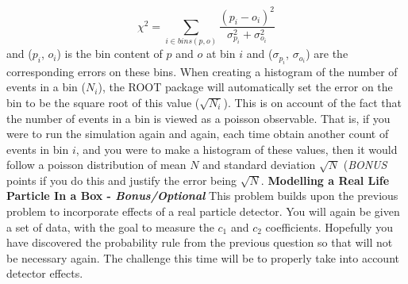 \documentclass[12pt]{article}
\begin{document}
\begin{displaymath}
\chi^{2}=\displaystyle\sum_{i \in bins(p,o)} \frac{(p_{i}-o_{i})^2}{\sigma_{p_{i}}^{2}+\sigma_{o_{i}}^{2}}
\end{displaymath}
and ($p_{i}$, $o_{i}$) is the bin content of $p$ and $o$ at bin $i$ and ($\sigma_{p_{i}}$, $\sigma_{o_{i}}$) are the corresponding errors on these bins.  When creating a histogram of the number of events in a bin ($N_{i}$), the ROOT package will automatically set the error on the bin to be the square root of this value ($\sqrt{N_{i}}$).  This is on account of the fact that the number of events in a bin is viewed as a poisson observable.  That is, if you were to run the simulation again and again, each time obtain another count of events in bin $i$, and you were to make a histogram of these values, then it would follow a poisson distribution of mean $N$ and standard deviation $\sqrt{N}$ (\textit{BONUS} points if you do this and justify the error being $\sqrt{N}$. 
\newline
\newline
\textbf{Modelling a \textbf{Real Life} Particle In a Box - \textit{Bonus/Optional}} 
\newline
This problem builds upon the previous problem to incorporate effects of a real particle detector.  You will again be given a set of data, with the goal to measure the $c_1$ and $c_2$ coefficients.  Hopefully you have discovered the probability rule from the previous question so that will not be necessary again.  The challenge this time will be to properly take into account detector effects.
\newline
\newline
\end{document}
